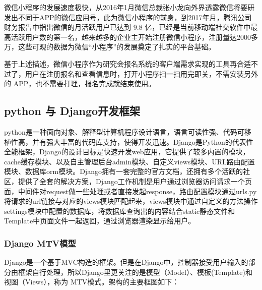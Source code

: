 \documentclass[a4paper]{ltxdoc}
\begin{document}
{		微信小程序的发展速度极快，从2016年1月微信总裁张小龙向外界透露微信将要研发出不同于APP的微信应用号，此为微信小程序的前身，到2017年月，腾讯公司财务报告中指出微信的月活跃用户已达到 9.8 亿，已经是当前移动端社交软件中最高活跃用户数的第一名，越来越多的企业主开始注册微信小程序，注册量达2000多万，这些可观的数据为微信“小程序”的发展奠定了扎实的平台基础。
		
		基于上述描述，微信小程序作为研究会报名系统的客户端需求实现的工具再合适不过了，用户在注册报名和查看信息时，打开小程序扫一扫用完即关，不需安装另外的 APP，也不需要打理，报名完成就结束使用。
		
		\subsection{python 与 Django开发框架}
		python是一种面向对象、解释型计算机程序设计语言，语言可读性强、代码可移植性高，并有强大丰富的代码库支持，使得开发迅速。Django是Python的代表性全能框架，Django的设计目标是快速开发web应用，它提供了较多内置的模块，cache缓存模块、以及自主管理后台admin模块、自定义views模块、URL路由配置模块、数据库orm模块。Django拥有一套完整的官方文档，还拥有多个活跃的社区，提供了全套的解决方案，Django工作机制是用户通过浏览器访问请求一个页面，中间件对request做一些处理或者直接发起response，路由配置模块通过urls.py将请求的url链接与对应的views模块匹配起来，views模块中通过自定义的方法操作settings模块中配置的数据库，将数据库查询出的内容结合static静态文件和Template中页面文件一起返回，通过浏览器渲染显示给用户。
		
		\subsubsection{Django MTV模型}
		Django是一个基于MVC构造的框架。但是在Django中，控制器接受用户输入的部分由框架自行处理，所以Django里更关注的是模型（Model）、模板(Template)和视图（Views），称为 MTV模式。架构的主要框图如下：
		
		
}
\end{document}
